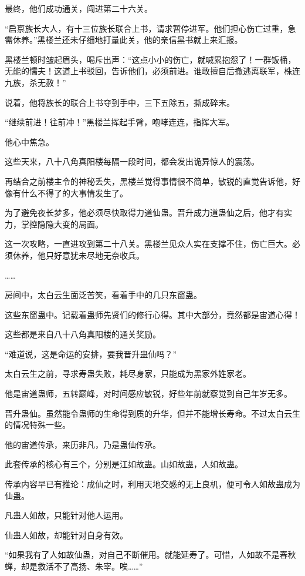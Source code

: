 \begin{this_body}
最终，他们成功通关，闯进第二十六关。

“启禀族长大人，有十三位族长联合上书，请求暂停进军。他们担心伤亡过重，急需休养。”黑楼兰还未仔细地打量此关，他的亲信黑书就上来汇报。

黑楼兰顿时皱起眉头，喝斥出声：“这点小小的伤亡，就喊累抱怨了！一群饭桶，无能的懦夫！这道上书驳回，告诉他们，必须前进。谁敢擅自后撤逃离联军，株连九族，杀无赦！”

说着，他将族长的联合上书夺到手中，三下五除五，撕成碎末。

“继续前进！往前冲！”黑楼兰挥起手臂，咆哮连连，指挥大军。

他心中焦急。

这些天来，八十八角真阳楼每隔一段时间，都会发出诡异惊人的震荡。

再结合之前楼主令的神秘丢失，黑楼兰觉得事情很不简单，敏锐的直觉告诉他，好像有什么不得了的大事情发生了。

为了避免夜长梦多，他必须尽快取得力道仙蛊。晋升成力道蛊仙之后，他才有实力，掌控隐隐大变的局面。

这一次攻略，一直进攻到第二十八关。黑楼兰见众人实在支撑不住，伤亡巨大。必须休养，他只好意犹未尽地无奈收兵。

……

房间中，太白云生面泛苦笑，看着手中的几只东窗蛊。

这些东窗蛊中。记载着蛊师先贤们的修行心得。其中大部分，竟然都是宙道心得！

这些都是来自八十八角真阳楼的通关奖励。

“难道说，这是命运的安排，要我晋升蛊仙吗？”

太白云生之前，寻求寿蛊失败，耗尽身家，只能成为黑家外姓家老。

他是宙道蛊师，五转巅峰，对时间感应敏锐，好些年前就察觉到自己年岁无多。

晋升蛊仙。虽然能令蛊师的生命得到质的升华，但并不能增长寿命。不过太白云生的情况特殊一些。

他的宙道传承，来历非凡，乃是蛊仙传承。

此套传承的核心有三个，分别是江如故蛊。山如故蛊，人如故蛊。

传承内容早已有推论：成仙之时，利用天地交感的无上良机，便可令人如故蛊成为仙蛊。

凡蛊人如故，只能针对他人运用。

仙蛊人如故，却能针对自身有效。

“如果我有了人如故仙蛊，对自己不断催用。就能延寿了。可惜，人如故不是春秋蝉，却是救活不了高扬、朱宰。唉……”


\end{this_body}
